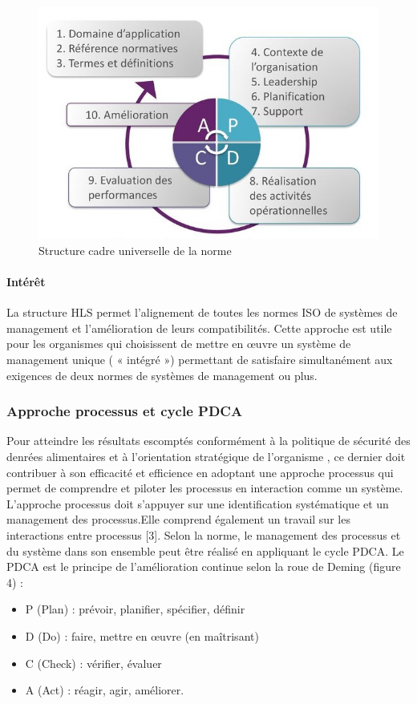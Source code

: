 \begin{spacing}{1.2}
\begin{figure}[!ht]\centering
\includegraphics[scale=2.5]{image7.jpg}
\caption{Structure cadre universelle de la norme}
\label{fig:fig1}
\end{figure}

\paragraph{Intérêt}

La structure HLS  permet l’alignement de toutes les normes ISO de systèmes de management et l’amélioration de leurs compatibilités. Cette approche est utile pour les organismes qui choisissent de mettre en œuvre un système de management unique ( « intégré ») permettant de satisfaire simultanément aux exigences de deux normes de systèmes de management ou plus.

\subsubsection{Approche processus et cycle PDCA}

Pour atteindre les résultats escomptés conformément à la politique de sécurité des denrées alimentaires et à l’orientation stratégique de l’organisme , ce dernier  doit contribuer à son efficacité et efficience en adoptant une approche processus qui permet de comprendre et piloter les processus en interaction comme un système. L’approche processus doit s’appuyer sur une identification systématique et un management des processus.Elle comprend également un travail sur les interactions entre processus [3].  Selon la norme, le management des processus et du système dans son ensemble peut être réalisé en appliquant le cycle PDCA. Le PDCA est le principe de l’amélioration continue selon la  roue de Deming (figure 4) :
\begin{itemize}
	\item P (Plan) : prévoir, planifier, spécifier, définir
	\item D (Do) : faire, mettre en œuvre (en maîtrisant)
	\item C (Check) : vérifier, évaluer
	\item A (Act) : réagir, agir, améliorer.
\end{itemize}


\end{spacing}
